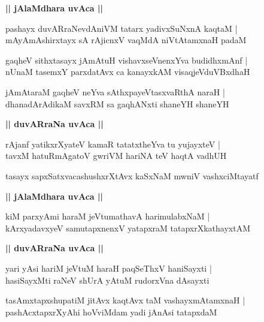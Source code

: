 \documentclass[twoside,12pt,openright]{book}
\newcounter{shloka}[chapter]
\def\uvaca#1{\centerline{{\large\textbf{#1}}}}
\begin{document}
\uvaca{|| jAlaMdhara uvAca ||}

\begin{shloka}%
pashayx duvARraNevdAniVM tatarx yadivxSuNxnA kaqtaM |\\
mAyAmAshirxtayx sA rAjicnxV vaqMdA niVtAtamxnaH padaM 
\end{shloka}

\begin{shloka}%
gaqheV sithxtasayx jAmAtuH vishavxseVnenxYva budidhxmAnf |\\
nUnaM tasemxY parxdatAvx ca kanayxkAM visaqjeVduVBxdhaH 
\end{shloka}

\begin{shloka}%
jAmAtaraM gaqheV neYva sAthxpayeVtasxvaRthA naraH |\\
dhanadArAdikaM savxRM sa gaqhANxti shaneYH shaneYH 
\end{shloka}

\uvaca{|| duvARraNa uvAca ||}

\begin{shloka}%
rAjanf yatikxrXyateV kamaR tatatxtheYva tu yujayxteV |\\
tavxM hatuRmAgatoV gwriVM hariNA teV haqtA vadhUH 
\end{shloka}

\begin{shloka}%
tasayx sapxSatxvacashushxrXtAvx kaSxNaM mwniV vashxciMtayatf 
\end{shloka}

\uvaca{|| jAlaMdhara uvAca ||}

\begin{shloka}%
kiM parxyAmi haraM jeVtumathavA harimulabxNaM |\\
kArxyadavxyeV samutapxnenxV yatapxraM tatapxrXkathayxtAM 
\end{shloka}

\uvaca{|| duvARraNa uvAca ||}

\begin{shloka}%
yari yAsi hariM jeVtuM haraH paqSeThxV haniSayxti |\\
hasiSayxMti raNeV shUrA yAtuM rudorxVna dAsayxti 
\end{shloka}

\begin{shloka}%
tasAmxtapxshupatiM jitAvx kaqtAvx taM vashayxmAtamxnaH |\\
pashAcxtapxrXyAhi hoVviMdam yadi jAnAsi tatapxdaM 
\end{shloka}
\end{document}
